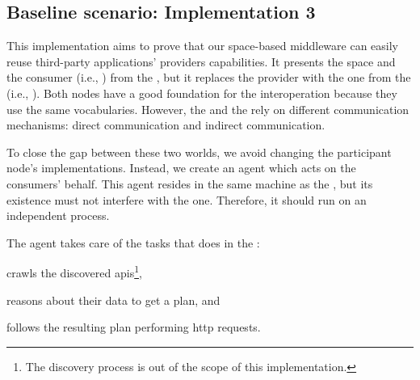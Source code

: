 

\subsection{Baseline scenario: Implementation 3}
\label{sec:actuation_scn3}
\newcommand{\implMix}{\emph{Implementation 3}}

This implementation aims to prove that our space-based middleware can easily reuse third-party applications' providers capabilities. %
It presents the space and the consumer (i.e., \nodeConsSpace{}) from the \implSpace{}, but it replaces the provider with the one from the \implRest{} (i.e., \nodeProvRest{}).
Both nodes have a good foundation for the interoperation because they use the same vocabularies. %
However, the \nodeProvRest{} and the \nodeConsSpace{} rely on different communication mechanisms: direct communication and indirect communication.


To close the gap between these two worlds, we avoid changing the participant node's implementations.
Instead, we create an agent which acts on the consumers' behalf. %
This agent resides in the same machine as the \Space{}, but its existence must not interfere with the \Space{} one. %
Therefore, it should run on an independent process.


The agent takes care of the tasks that \nodeConsRest{} does in the \implRest:
\begin{enumerate*}[label=\itshape(\arabic*\upshape)]
  \item crawls the discovered \acsp{api}\footnote{The discovery process is out of the scope of this implementation.},
  \item reasons about their data to get a plan, and
  \item follows the resulting plan performing \acs{http} requests.
\end{enumerate*}


